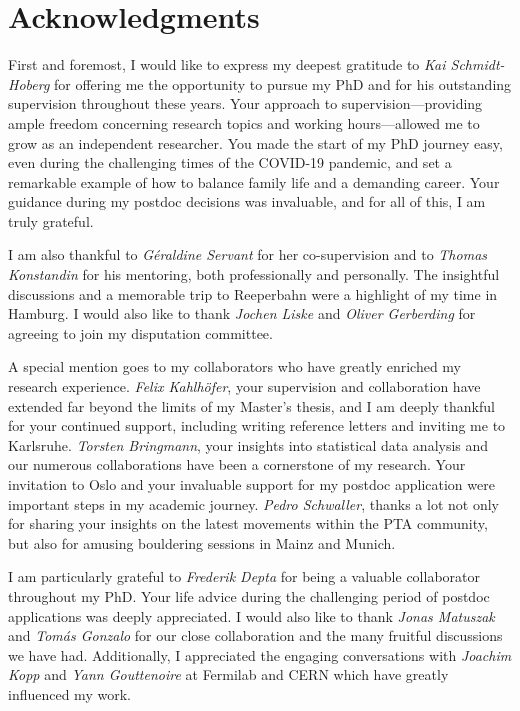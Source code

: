
\begingroup
\let\clearpage\relax
\let\cleardoublepage\relax
\let\cleardoublepage\relax
\chapter*{Acknowledgments}

First and foremost, I would like to express my deepest gratitude to \textit{Kai Schmidt-Hoberg} for offering me the opportunity to pursue my PhD and for his outstanding supervision throughout these years. Your approach to supervision---providing ample freedom concerning research topics and working hours---allowed me to grow as an independent researcher. You made the start of my PhD journey easy, even during the challenging times of the COVID-19 pandemic, and set a remarkable example of how to balance family life and a demanding career. Your guidance during my postdoc decisions was invaluable, and for all of this, I am truly grateful.

I am also thankful to \textit{Géraldine Servant} for her co-supervision and to \textit{Thomas Konstandin} for his mentoring, both professionally and personally. The insightful discussions and a memorable trip to Reeperbahn were a highlight of my time in Hamburg. I would also like to thank \textit{Jochen Liske} and \textit{Oliver Gerberding} for agreeing to join my disputation committee.

A special mention goes to my collaborators who have greatly enriched my research experience. \textit{Felix Kahlhöfer}, your supervision and collaboration have extended far beyond the limits of my Master’s thesis, and I am deeply thankful for your continued support, including writing reference letters and inviting me to Karlsruhe. \textit{Torsten Bringmann}, your insights into statistical data analysis and our numerous collaborations have been a cornerstone of my research. Your invitation to Oslo and your invaluable support for my postdoc application were important steps in my academic journey. \textit{Pedro Schwaller}, thanks a lot not only for sharing your insights on the latest movements within the \acs{PTA} community, but also for amusing bouldering sessions in Mainz and Munich.

I am particularly grateful to \textit{Frederik Depta} for being a valuable collaborator throughout my PhD. Your life advice during the challenging period of postdoc applications was deeply appreciated. I would also like to thank \textit{Jonas Matuszak} and \textit{Tomás Gonzalo} for our close collaboration and the many fruitful discussions we have had. Additionally, I appreciated the engaging conversations with \textit{Joachim Kopp} and \textit{Yann Gouttenoire} at Fermilab and CERN which have greatly influenced my work.

